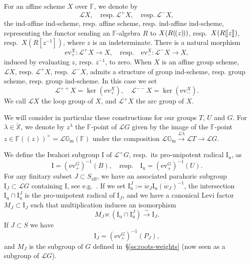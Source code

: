 \documentclass[11pt]{amsart}
\numberwithin{equation}{section}
\theoremstyle{plain}
\theoremstyle{definition}
\newcommand{\F}{{\mathbb F}}
\newcommand{\I}{{\mathrm I}}
\newcommand{\sL}{{\mathcal L}}
\newcommand{\X}{{\mathbb X}}
\newcommand{\Xd}{\check{\X}}
\newcommand{\Gm}{{\mathbb{G}_{\mathrm{m}}}}
\newcommand{\simto}{\xrightarrow{\sim}}
\newcommand{\af}{\mathrm{aff}}
\newcommand{\Iu}{\mathrm{I}_{\mathrm{u}}}
\begin{document}
For an affine scheme $X$ over $\F$, we denote by 
\[
\sL{X},\quad \text{resp.}\ \sL^+X, \quad \text{resp.}\ \sL^-X,
\]
the ind-affine ind-scheme, resp. affine scheme, resp. ind-affine ind-scheme, represen\-ting the functor sending an $\F$-algebra $R$ to $X(R( \hspace{-1pt} (z) \hspace{-1pt} ))$, resp.~$X(R[ \hspace{-1pt} [z] \hspace{-1pt} ])$, resp.~$X(R[z^{-1}])$, where $z$ is an indeterminate. 
There is a natural morphism
\[
\mathrm{ev}^X_+:\sL^+X\rightarrow X, \quad \text{resp.} \quad \mathrm{ev}^X_-:\sL^-X\rightarrow X,
\]
induced by evaluating $z$, resp. $z^{-1}$, to zero. 
When $X$ is an affine group scheme, $\sL{X}$, resp. $\sL^+X$, resp. $\sL^-X$, admits a structure of group ind-scheme, resp. group scheme, resp. group ind-scheme. 
In this case we set
\[
\sL^{++}X=\ker(\mathrm{ev}^X_+), \quad \sL^{--}X=\ker(\mathrm{ev}^X_-).
\] 
We call $\sL X$ the loop group of $X$, and $\sL^+X$ the arc group of $X$. 

We will consider in particular these constructions for our groups $T$, $U$ and $G$.
For $\lambda\in \Xd$, we denote by $z^\lambda$ the $\F$-point of $\sL{G}$ given by the image of the $\F$-point $z\in \F(\!(z)\!)^\times = \sL\Gm(\F)$ under the composition $\sL\Gm\xrightarrow{\sL\lambda} \sL{T} \rightarrow \sL{G}$. 

We define the Iwahori subgroup $\I$ of $\sL^+ G$, resp.~its pro-unipotent radical $\Iu$, as
\[
\I=(\mathrm{ev}^G_+)^{-1}(B), \quad \text{resp.} \quad \Iu=(\mathrm{ev}_+^G)^{-1}(U).
\] 
For any finitary subset $J \subset S_\af$, we have an associated parahoric subgroup $\I_J \subset \sL G$ containing $\I$, see e.g.~\cite[\S 3.4]{AR23}. If we set $\Iu^J := \dot{w}_J \Iu (\dot{w}_J)^{-1}$, the intersection $\Iu \cap \Iu^J$ is the pro-unipotent radical of $\I_J$, and we have a canonical Levi factor $M_J \subset \I_J$ such that multiplication induces an isomorphism
\[
M_J \ltimes (\Iu \cap \Iu^J) \simto \I_J.
\]
If $J \subset S$ 
we have
\[
\I_{J}=(\mathrm{ev}^G_+)^{-1}(P_J), 
\]
and $M_J$ is the subgroup of $G$ defined in~\S\ref{ss:roots-weights} (now seen as a subgroup of $\sL G$).
\end{document}
